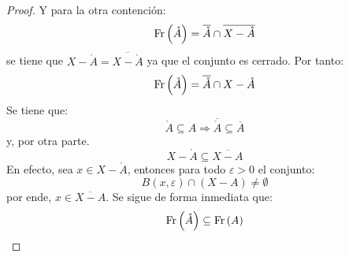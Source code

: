 \documentclass[12pt]{report}
\theoremstyle{largebreak}
\begin{document}
\begin{proof}
        Y para la otra contención:
        \begin{equation*}
            \textup{Fr}\left(\mathring{A}\right)=\overline{\mathring{A}}\cap\overline{X-\mathring{A}}
        \end{equation*}
        se tiene que $X-\mathring{A}=\overline{X-\mathring{A}}$ ya que el conjunto es cerrado. Por tanto:
        \begin{equation*}
            \textup{Fr}\left(\mathring{A}\right)=\overline{\mathring{A}}\cap X-\mathring{A}
        \end{equation*}
        Se tiene que:
        \begin{equation*}
            \mathring{A}\subseteq A\Rightarrow\overline{\mathring{A}}\subseteq\overline{A}
        \end{equation*}
        y, por otra parte.
        \begin{equation*}
            X-\mathring{A}\subseteq \overline{X-A}
        \end{equation*}
        En efecto, sea $x\in X-\mathring{A}$, entonces para todo $\varepsilon>0$ el conjunto:
        \begin{equation*}
            B(x,\varepsilon)\cap (X-A)\neq\emptyset
        \end{equation*}
        por ende, $x\in\overline{X-A}$. Se sigue de forma inmediata que:
        \begin{equation*}
            \textup{Fr}\left(\mathring{A}\right)\subseteq\textup{Fr}\left(A\right)
        \end{equation*}
    \end{proof}
\end{document}

